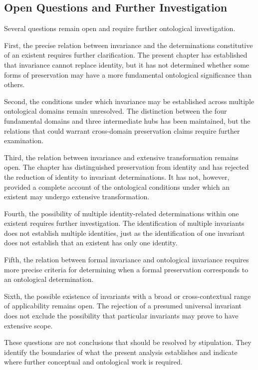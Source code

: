 \subsection{Open Questions and Further Investigation}

Several questions remain open and require further
ontological investigation.

First, the precise relation between invariance and
the determinations constitutive of an existent
requires further clarification. The present chapter
has established that invariance cannot replace
identity, but it has not determined whether some
forms of preservation may have a more fundamental
ontological significance than others.

Second, the conditions under which invariance may
be established across multiple ontological domains
remain unresolved. The distinction between the
four fundamental domains and three intermediate
hubs has been maintained, but the relations that
could warrant cross-domain preservation claims
require further examination.

Third, the relation between invariance and extensive
transformation remains open. The chapter has
distinguished preservation from identity and has
rejected the reduction of identity to invariant
determinations. It has not, however, provided a
complete account of the ontological conditions
under which an existent may undergo extensive
transformation.

Fourth, the possibility of multiple identity-related
determinations within one existent requires further
investigation. The identification of multiple
invariants does not establish multiple identities,
just as the identification of one invariant does
not establish that an existent has only one identity.

Fifth, the relation between formal invariance and
ontological invariance requires more precise
criteria for determining when a formal preservation
corresponds to an ontological determination.

Sixth, the possible existence of invariants with
a broad or cross-contextual range of applicability
remains open. The rejection of a presumed universal
invariant does not exclude the possibility that
particular invariants may prove to have extensive
scope.

These questions are not conclusions that should
be resolved by stipulation. They identify the
boundaries of what the present analysis establishes
and indicate where further conceptual and ontological
work is required.

